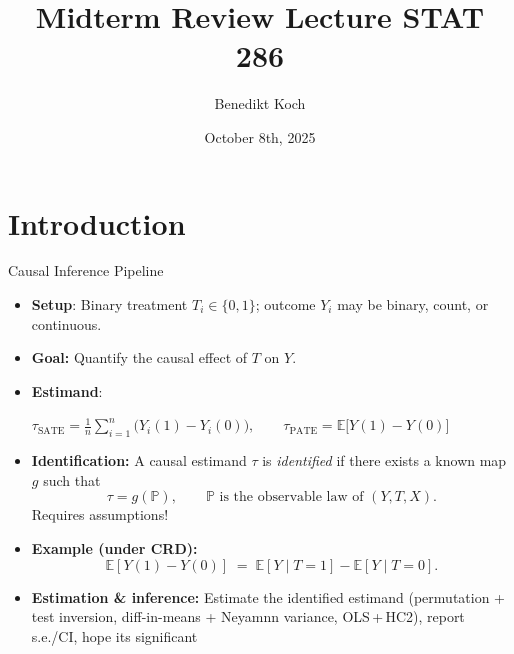 \documentclass[10pt, handout]{beamer}
\title{Midterm Review Lecture STAT 286}
\author{Benedikt Koch}
\date{October 8th, 2025}
\theoremstyle{plain}
\begin{document}
\begin{frame}[plain]

  \maketitle

\end{frame}




\section{Introduction}

\begin{frame}{Causal Inference Pipeline}
\begin{itemize}
    \item \textbf{Setup}: Binary treatment \(T_i\in\{0,1\}\); outcome \(Y_i\) may be binary, count, or continuous.
    \pause
    \item \textbf{Goal:} Quantify the causal effect of \(T\) on \(Y\).
    \pause
    \item \textbf{Estimand}: 
    
    \(\displaystyle \tau_{\text{SATE}}=\frac{1}{n}\sum_{i=1}^n\big(Y_i(1)-Y_i(0)\big), \qquad  \tau_{\text{PATE}}=\mathbb{E}\big[Y(1)-Y(0)\big]\)
    \pause
    \item \textbf{Identification:} A causal estimand \(\tau\) is \emph{identified} if there exists a known map \(g\) such that
  \[
    \tau=g(\mathbb{P}),\qquad \mathbb{P} \text{ is the observable law of } (Y,T,X).
  \]
  Requires assumptions!
    \item \textbf{Example (under CRD):}
  \[
    \mathbb{E}[Y(1)-Y(0)] \;=\; \mathbb{E}[Y\!\mid\!T{=}1]-\mathbb{E}[Y\!\mid\!T{=}0].
  \]
  \pause
    \item \textbf{Estimation \& inference:} Estimate the identified estimand (permutation + test inversion, diff-in-means + Neyamnn variance, OLS\,+\,HC2), report s.e./CI, hope its significant
\end{itemize}

\end{frame}
\end{document}
